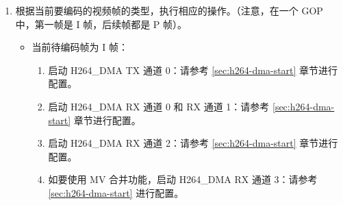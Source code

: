 \documentclass[main\_\_CN.tex]{subfiles}
\begin{document}
\begin{enumerate}
\begin{enumerate}
        \begin{itemize}
                \item \hyperref[fielddesc:H264SLICEBYTEMSB]{H264\_SLICE\_BYTE\_MSB}：切片头的第 41 位到第 10 位
                \item \hyperref[fielddesc:H264SLICEBYTELSB]{H264\_SLICE\_BYTE\_LSB}：切片头的第 9 位到第 2 位
                \item \hyperref[fielddesc:H264SLICEREMAINBIT]{H264\_SLICE\_REMAIN\_BIT}：切片头的第 1 位
                \item \hyperref[fielddesc:H264SLICEBYTELENGTH]{H264\_SLICE\_BYTE\_LENGTH}：5
                \item \hyperref[fielddesc:H264SLICEREMAINBITLENGTH]{H264\_SLICE\_REMAIN\_BITLENGTH}：1
            \end{itemize}
        \item 配置原始视频色彩空间：将寄存器 \hyperref[fielddesc:H264AORICOLORSPACE]{H264\_A\_ORI\_COLOR\_SPACE} 配置为对应的原始视频色彩空间。
        \item 如需使用量化结果降采样功能，请参考 \ref{sec:h264-decimate} 章节配置相关寄存器。
        \item 如需使用宏块级码率控制功能，请参考 \ref{sec:h264-rate-ctrl} 章节配置相关寄存器。
        \item 如需使用 ROI 功能，请参考 \ref{sec:h264-roi} 章节配置相关寄存器。
        \item 如需使用 MV 合并功能，请参考 \ref{sec:h264-mv-merge} 章节配置相关寄存器。
        \item 如需使用调试功能，请参考 \ref{sec:h264-debug-func} 章节配置相关寄存器。
    \end{enumerate}
    \item\label{item:h264-gop-frame} 根据当前要编码的视频帧的类型，执行相应的操作。（注意，在一个 GOP 中，第一帧是 I 帧，后续帧都是 P 帧）。
    \begin{itemize}
        \item 当前待编码帧为 I 帧：
        \begin{enumerate}
            \item 启动 H264\_DMA TX 通道 0：请参考 \ref{sec:h264-dma-start} 章节进行配置。
            \item 启动 H264\_DMA RX 通道 0 和 RX 通道 1：请参考 \ref{sec:h264-dma-start} 章节进行配置。
            \item 启动 H264\_DMA RX 通道 2：请参考 \ref{sec:h264-dma-start} 章节进行配置。
            \item 如要使用 MV 合并功能，启动 H264\_DMA RX 通道 3：请参考 \ref{sec:h264-dma-start} 进行配置。

\end{enumerate}
\end{itemize}
\end{enumerate}
\end{document}
